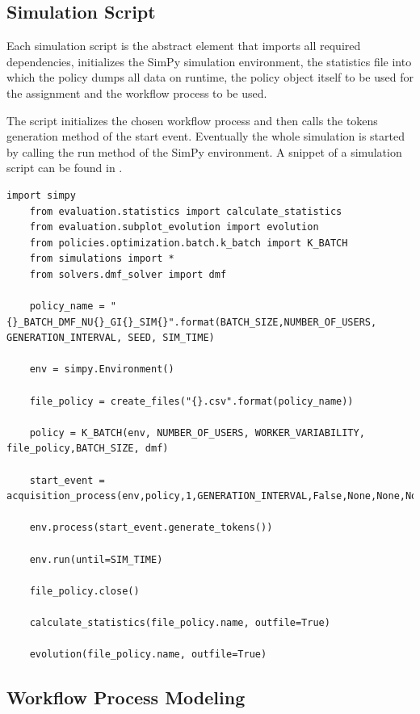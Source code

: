 \documentclass{seal_thesis}
\begin{document}
\subsection{Simulation Script}

Each simulation script is the abstract element that imports all required dependencies, initializes the SimPy simulation environment, the statistics file into which the policy dumps all data on runtime, the policy object itself to be used for the assignment and the workflow process to be used. 

The script initializes the chosen workflow process and then calls the tokens generation method of the start event. Eventually the whole simulation is started by calling the run method of the SimPy environment. A snippet of a simulation script can be found in .

\begin{lstlisting}[caption=Example of the structure of a simulation script. Here for the K-Batch policy using the \gls{dmf} solver,label=lst:simulation_script,style=CustomPython]
	import simpy
	from evaluation.statistics import calculate_statistics
	from evaluation.subplot_evolution import evolution
	from policies.optimization.batch.k_batch import K_BATCH
	from simulations import *
	from solvers.dmf_solver import dmf

	policy_name = "{}_BATCH_DMF_NU{}_GI{}_SIM{}".format(BATCH_SIZE,NUMBER_OF_USERS, GENERATION_INTERVAL, SEED, SIM_TIME)

	env = simpy.Environment()

	file_policy = create_files("{}.csv".format(policy_name))

	policy = K_BATCH(env, NUMBER_OF_USERS, WORKER_VARIABILITY, file_policy,BATCH_SIZE, dmf)

	start_event = acquisition_process(env,policy,1,GENERATION_INTERVAL,False,None,None,None)

	env.process(start_event.generate_tokens())

	env.run(until=SIM_TIME)

	file_policy.close()

	calculate_statistics(file_policy.name, outfile=True)

	evolution(file_policy.name, outfile=True)
\end{lstlisting}

\subsection{Workflow Process Modeling}
\end{document}
